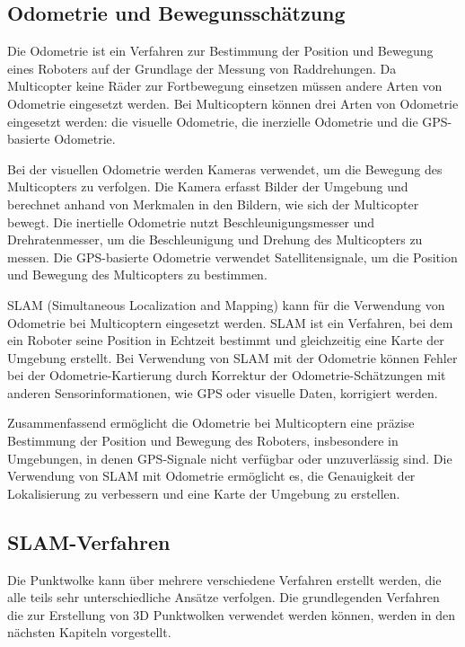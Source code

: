 \cite[vgl.][Kapitel 9.2 und Kapitel 7.8.1]{SWB-165930377X}



\subsection{Odometrie und Bewegunsschätzung}

Die Odometrie ist ein Verfahren zur Bestimmung der Position und Bewegung eines Roboters auf der Grundlage der Messung von Raddrehungen. Da Multicopter keine Räder zur Fortbewegung einsetzen müssen andere Arten von Odometrie eingesetzt werden. Bei Multicoptern können drei Arten von Odometrie eingesetzt werden: die visuelle Odometrie, die inerzielle Odometrie und die GPS-basierte Odometrie.


Bei der visuellen Odometrie werden Kameras verwendet, um die Bewegung des Multicopters zu verfolgen. Die Kamera erfasst Bilder der Umgebung und berechnet anhand von Merkmalen in den Bildern, wie sich der Multicopter bewegt. Die inertielle Odometrie nutzt Beschleunigungsmesser und Drehratenmesser, um die Beschleunigung und Drehung des Multicopters zu messen. Die GPS-basierte Odometrie verwendet Satellitensignale, um die Position und Bewegung des Multicopters zu bestimmen.

SLAM (Simultaneous Localization and Mapping) kann für die Verwendung von Odometrie bei Multicoptern eingesetzt werden. SLAM ist ein Verfahren, bei dem ein Roboter seine Position in Echtzeit bestimmt und gleichzeitig eine Karte der Umgebung erstellt. Bei Verwendung von SLAM mit der Odometrie können Fehler bei der Odometrie-Kartierung durch Korrektur der Odometrie-Schätzungen mit anderen Sensorinformationen, wie GPS oder visuelle Daten, korrigiert werden.

Zusammenfassend ermöglicht die Odometrie bei Multicoptern eine präzise Bestimmung der Position und Bewegung des Roboters, insbesondere in Umgebungen, in denen GPS-Signale nicht verfügbar oder unzuverlässig sind. Die Verwendung von SLAM mit Odometrie ermöglicht es, die Genauigkeit der Lokalisierung zu verbessern und eine Karte der Umgebung zu erstellen.

\subsection{SLAM-Verfahren}

Die Punktwolke kann über mehrere verschiedene Verfahren erstellt werden, die alle teils sehr unterschiedliche Ansätze verfolgen. Die grundlegenden Verfahren die zur Erstellung von 3D Punktwolken verwendet werden können, werden in den nächsten Kapiteln vorgestellt.


